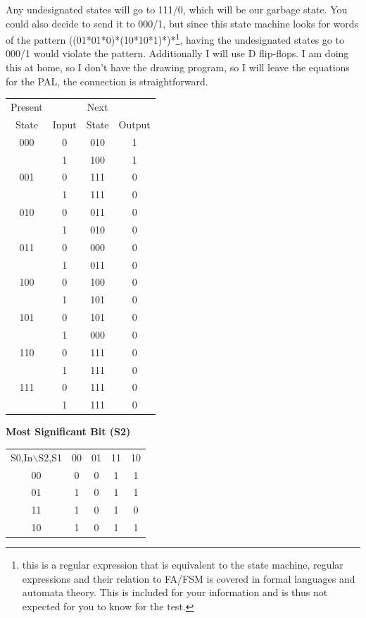     {\color{ans}
    Any undesignated states will go to 111/0, which will be our garbage state.  You could also decide to send it to 000/1, but since this state machine looks for words of the pattern ((01*01*0)*(10*10*1)*)*\footnote{{\color{ans} this is a regular expression that is equivalent to the state machine, regular expressions and their relation to FA/FSM is covered in formal languages and automata theory.  This is included for your information and is thus not expected for you to know for the test.}}, having the undesignated states go to 000/1 would violate the pattern.  Additionally I will use D flip-flops.  I am doing this at home, so I don't have the drawing program, so I will leave the equations for the PAL, the connection is straightforward.


    \begin{tabular}{c|c||c|c}
      Present &       & Next  &        \\
      State   & Input & State & Output \\ \hline \hline
      000     & 0     & 010   & 1 \\
              & 1     & 100   & 1 \\ \hline
      001     & 0     & 111   & 0 \\
              & 1     & 111   & 0 \\ \hline
      010     & 0     & 011   & 0 \\
              & 1     & 010   & 0 \\ \hline
      011     & 0     & 000   & 0 \\
              & 1     & 011   & 0 \\ \hline
      100     & 0     & 100   & 0 \\
              & 1     & 101   & 0 \\ \hline
      101     & 0     & 101   & 0 \\
              & 1     & 000   & 0 \\ \hline
      110     & 0     & 111   & 0 \\
              & 1     & 111   & 0 \\ \hline
      111     & 0     & 111   & 0 \\
              & 1     & 111   & 0 \\ \hline
    \end{tabular}

    \textbf{Most Significant Bit (S2)}

    \begin{tabular}{c|c|c|c|c|}
    \multicolumn{1}{c}{S0,In$\backslash$S2,S1} & \multicolumn{1}{c}{00} & \multicolumn{1}{c}{01} & \multicolumn{1}{c}{11} & \multicolumn{1}{c}{10} \\ \cline{2-5}
    00 & 0 & 0 & 1 & 1 \\ \cline{2-5}
    01 & 1 & 0 & 1 & 1 \\ \cline{2-5}
    11 & 1 & 0 & 1 & 0 \\ \cline{2-5}
    10 & 1 & 0 & 1 & 1 \\ \cline{2-5}
    \end{tabular}

}
